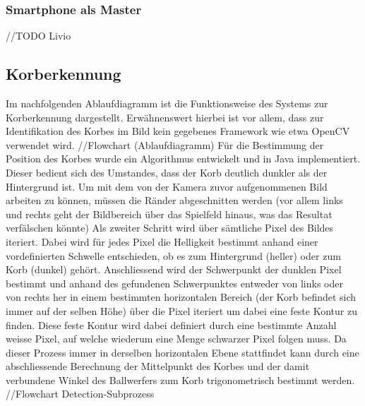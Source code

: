 \subsubsection{Smartphone als Master}
	//TODO Livio
	
	
	\subsection{Korberkennung}
	Im nachfolgenden Ablaufdiagramm ist die Funktionsweise des Systems zur Korberkennung dargestellt. Erwähnenswert hierbei ist vor allem, dass zur Identifikation des Korbes im Bild kein gegebenes Framework wie etwa OpenCV verwendet wird.
	//Flowchart (Ablaufdiagramm)
	Für die Bestimmung der Position des Korbes wurde ein Algorithmus entwickelt und in Java implementiert. Dieser bedient sich des Umstandes, dass der Korb deutlich dunkler als der Hintergrund ist. Um mit dem von der Kamera zuvor aufgenommenen Bild arbeiten zu können, müssen die Ränder abgeschnitten werden (vor allem links und rechts geht der Bildbereich über das Spielfeld hinaus, was das Resultat verfälschen könnte) Als zweiter Schritt wird über sämtliche Pixel des Bildes iteriert. Dabei wird für jedes Pixel die Helligkeit bestimmt anhand einer vordefinierten Schwelle entschieden, ob es zum Hintergrund (heller) oder zum Korb (dunkel) gehört. Anschliessend wird der Schwerpunkt der dunklen Pixel bestimmt und anhand des gefundenen Schwerpunktes entweder von links oder von rechts her in einem bestimmten horizontalen Bereich (der Korb befindet sich immer auf der selben Höhe) über die Pixel iteriert um dabei eine feste Kontur zu finden. Diese feste Kontur wird dabei definiert durch eine bestimmte Anzahl weisse Pixel, auf welche wiederum eine Menge schwarzer Pixel folgen muss. Da dieser Prozess immer in derselben horizontalen Ebene stattfindet kann durch eine abschliessende Berechnung der Mittelpunkt des Korbes und der damit verbundene Winkel des Ballwerfers zum Korb trigonometrisch bestimmt werden.
	//Flowchart Detection-Subprozess
	